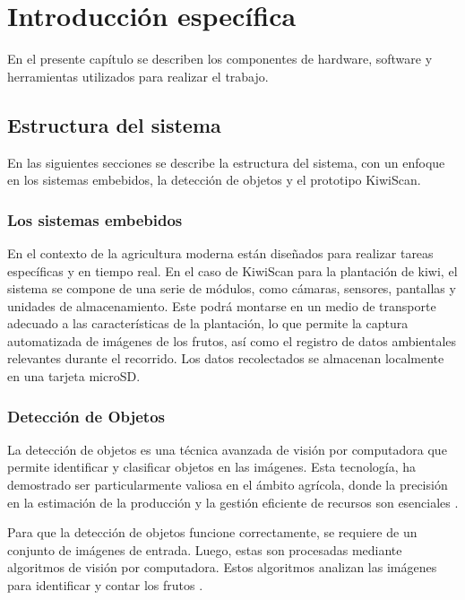 \chapter{Introducción específica} %

\label{Chapter2}

En el presente capítulo se describen los componentes de hardware, software y herramientas utilizados para realizar el trabajo.

\section{Estructura del sistema}

En las siguientes secciones se describe la estructura del sistema, con un enfoque en los sistemas embebidos, la detección de objetos y el prototipo KiwiScan.

\subsection{Los sistemas embebidos}

En el contexto de la agricultura moderna están diseñados para realizar tareas específicas y en tiempo real. En el caso de KiwiScan para la plantación de kiwi, el sistema se compone de una serie de módulos, como cámaras, sensores, pantallas y unidades de almacenamiento. Este podrá montarse en un medio de transporte adecuado a las características de la plantación, lo que permite la captura automatizada de imágenes de los frutos, así como el registro de datos ambientales relevantes durante el recorrido. Los datos recolectados se almacenan localmente en una tarjeta microSD.

\subsection{Detección de Objetos}

La detección de objetos es una técnica avanzada de visión por computadora que permite identificar y clasificar objetos en las imágenes. Esta tecnología, ha demostrado ser particularmente valiosa en el ámbito agrícola, donde la precisión en la estimación de la producción y la gestión eficiente de recursos son esenciales \citep{Lim2020}. 

Para que la detección de objetos funcione correctamente, se requiere de un conjunto de imágenes de entrada. Luego, estas son procesadas mediante algoritmos de visión por computadora. Estos algoritmos analizan las imágenes para identificar y contar los frutos \citep{Montiel2019}.

